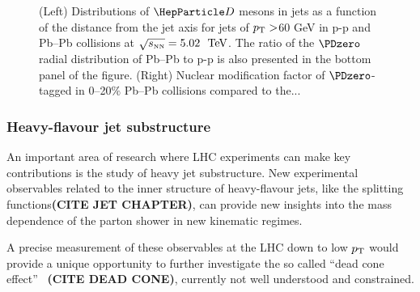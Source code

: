 \begin{figure}
\caption{(Left) Distributions of $\PD$ mesons in jets as a function of the distance from the jet axis for jets of $p_{\rm T}>$60 GeV in p-p and Pb--Pb collisions at $\sqrt{s_{\scriptscriptstyle \rm NN}}=5.02~{~\text{TeV}}$. The ratio of the $\PDzero$ radial distribution of Pb--Pb to p-p is also presented in the bottom panel of the figure. (Right) Nuclear modification factor of $\PDzero$-tagged in 0--20$\%$ Pb--Pb collisions compared to the... }
\label{fig:DjetCMS}
\end {figure}

\subsubsection{Heavy-flavour jet substructure}
An important area of research where LHC experiments can make key contributions is the study of heavy jet substructure.
New experimental observables related to the inner structure of heavy-flavour jets, like the splitting functions\textbf{(CITE JET CHAPTER)}, can provide new insights into the mass dependence 
of the parton shower in new kinematic regimes. 

A precise measurement of these observables at the LHC down to low $p_{\rm T}$ would provide a unique opportunity to further investigate the so called ``dead cone effect''~\cite{Li:2017wwc} \textbf{(CITE DEAD CONE)}, currently not well understood and constrained.


